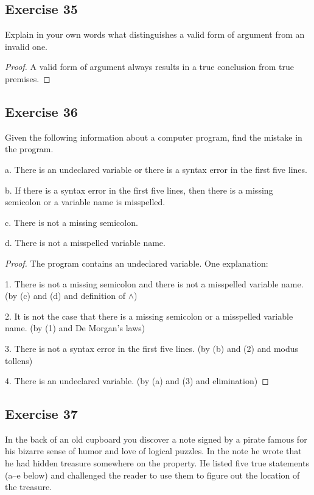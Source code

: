 \documentclass[14pt]{extarticle}
\begin{document}
\subsection{Exercise 35}
Explain in your own words what distinguishes a valid form of argument from an invalid one.

\begin{proof}
    A valid form of argument always results in a true conclusion from true premises.
\end{proof}

\subsection{Exercise 36}
Given the following information about a computer program, find the mistake in the program.

a. There is an undeclared variable or there is a syntax error in the first five lines.

b. If there is a syntax error in the first five lines, then there is a missing semicolon or a variable name is misspelled.

c. There is not a missing semicolon.

d. There is not a misspelled variable name.

\begin{proof}
    The program contains an undeclared variable. One explanation:

    1. There is not a missing semicolon and there is not a misspelled variable name. (by (c) and (d) and definition of $\wedge$)

    2. It is not the case that there is a missing semicolon or a misspelled variable name. (by (1) and De Morgan’s laws)

    3. There is not a syntax error in the first five lines. (by (b) and (2) and modus tollens)

    4. There is an undeclared variable. (by (a) and (3) and elimination)
\end{proof}

\subsection{Exercise 37}
In the back of an old cupboard you discover a note signed by a pirate famous for his bizarre sense of humor and love of logical puzzles. In the note he wrote that he had hidden treasure somewhere on the property. He listed five true statements (a–e below) and challenged the reader to use them to figure out the location of the treasure.
\end{document}
